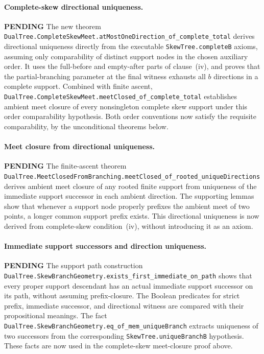\documentclass[11pt]{article}
\newcommand{\todo}{\textcolor{gray!70!black}{\textbf{PENDING}}}
\newcommand{\lean}[1]{\texttt{#1}}
\begin{document}
\paragraph{Complete-skew directional uniqueness.} \todo
The new theorem
\lean{DualTree.CompleteSkewMeet.atMostOneDirection_of_complete_total}
derives directional uniqueness directly from the executable
\lean{SkewTree.completeB} axioms, assuming only comparability of distinct
support nodes in the chosen auxiliary order.  It uses the full-before and
empty-after parts of clause~(iv), and proves that the partial-branching
parameter at the final witness exhausts all $b$ directions in a complete
support.  Combined with finite ascent,
\lean{DualTree.CompleteSkewMeet.meetClosed_of_complete_total}
establishes ambient meet closure of every nonsingleton complete skew support
under this order comparability hypothesis.  Both order conventions now
satisfy the requisite comparability, by the unconditional theorems below.

\paragraph{Meet closure from directional uniqueness.} \todo
The finite-ascent theorem
\lean{DualTree.MeetClosedFromBranching.meetClosed_of_rooted_uniqueDirections}
derives ambient meet closure of any rooted finite support from uniqueness
of the immediate support successor in each ambient direction.
The supporting lemmas show that whenever a support node properly prefixes
the ambient meet of two points, a longer common support prefix exists.
This directional uniqueness is now derived from complete-skew
condition~(iv), without introducing it as an axiom.

\paragraph{Immediate support successors and direction uniqueness.} \todo
The support path construction
\lean{DualTree.SkewBranchGeometry.exists_first_immediate_on_path}
shows that every proper support descendant has an actual immediate
support successor on its path, without assuming prefix-closure.
The Boolean predicates for strict prefix, immediate successor, and
directional witness are compared with their propositional meanings.
The fact
\lean{DualTree.SkewBranchGeometry.eq_of_mem_uniqueBranch}
extracts uniqueness of two successors from the corresponding
\lean{SkewTree.uniqueBranchB} hypothesis.  These facts are now used in
the complete-skew meet-closure proof above.
\end{document}
